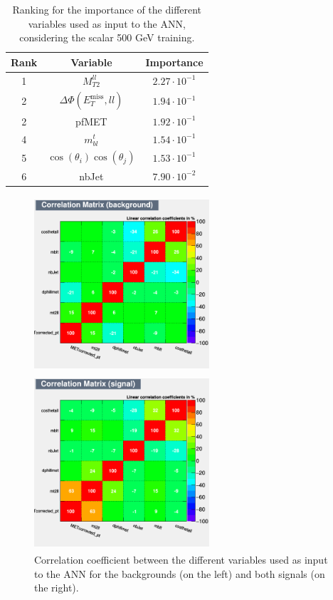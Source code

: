 \documentclass[a4paper, 10pt, openright]{report}
\begin{document}
\begin{table}
\begin{center}
\begin{tabular}{ c|c|c } 
\hline
 Rank & Variable & Importance \\
 \hline
 1 & $M_{T2}^{ll}$ & $2.27 \cdot 10^{-1}$ \\
 2 & $\Delta \Phi(E_{T}^{\text{miss}}, ll)$ & $1.94 \cdot 10^{-1}$ \\ 
 2 & pf\ac{MET} & $1.92 \cdot 10^{-1}$ \\
 4 & $m_{bl}^t$ & $1.54 \cdot 10^{-1}$ \\
 5 & $\cos(\theta_i) \cos(\theta_j)$ & $1.53 \cdot 10^{-1}$ \\
 6 & nbJet & $7.90 \cdot 10^{-2}$ \\
\hline
\end{tabular}
\caption{Ranking for the importance of the different variables used as input to the \ac{ANN}, considering the scalar 500 GeV training.}
\label{table:importance2}
\end{center}
\end{table}

\begin{figure}[htbp]
\centering
\begin{minipage}[b]{.49\textwidth}
\includegraphics[width=6.5cm, height=6.5cm]{figs/corr_background.png}
\end{minipage}\hfill
\begin{minipage}[b]{.49\textwidth}
\includegraphics[width=6.5cm, height=6.5cm]{figs/corr_signal.png}
\end{minipage} \hfill
\caption{Correlation coefficient between the different variables used as input to the \ac{ANN} for the backgrounds (on the left) and both signals (on the right).}
\label{fig:correlationVar}
\end{figure}
\end{document}
